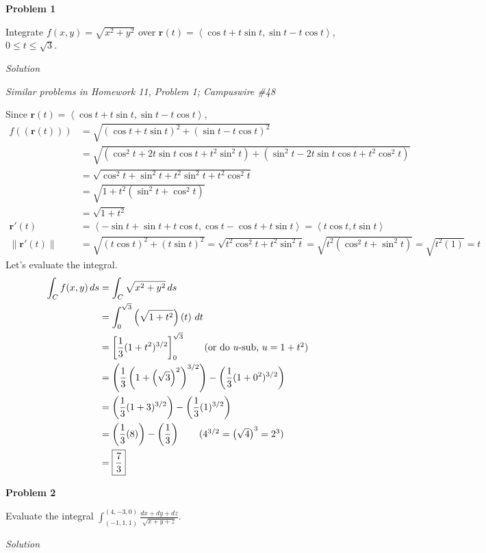 \documentclass{article}
\newcommand{\lrp}[1]{\left( #1 \right)}
\newcommand{\lra}[1]{\left\langle #1 \right\rangle}
\newcommand{\lrb}[1]{\left[ #1 \right]}
\newcommand{\norm}[1]{\left\lVert #1 \right\rVert}
\renewcommand{\r}[0]{\mathbf{r}}
\newcommand{\Solution}{\textit{Solution}}
\begin{document}
{}\textbf{Problem 1}

Integrate $f(x,y)=\sqrt{x^2+y^2}$ over $\r(t)=\lra{\cos t + t\sin t, \sin t - t\cos t}$, $0\leq t\leq \sqrt{3}$.

\Solution

\textit{Similar problems in Homework 11, Problem 1; Campuswire \#48}

Since $\r(t)=\lra{\cos t + t\sin t, \sin t - t\cos t}$,
\begin{align*}
f(\lrp{\r(t)})&=\sqrt{\lrp{\cos t + t\sin t}^2 + (\sin t - t\cos t)^2}\\
&=\sqrt{\lrp{\cos^2t + 2t\sin t \cos t + t^2\sin^2 t}+\lrp{\sin^2 t - 2t\sin t\cos t+t^2\cos^2 t}}\\
&=\sqrt{\cos^2 t +\sin^2 t + t^2\sin^2 t + t^2\cos ^ 2 t }\\
&=\sqrt{1 + t^2\lrp{\sin ^2 t + \cos ^ 2 t}}\tag{$\cos ^2 t + \sin ^2 t = 1$}\\
&=\sqrt{1 + t^2}\tag{$\sin ^2 t + \cos ^2 t + 1$}\\
    \r'(t)&=\lra{-\sin t + \sin t + t\cos t, \cos t - \cos t + t\sin t}=\lra{t\cos t, t \sin t}\\
    \norm{\r'(t)}&=\sqrt{(t\cos t)^2+(t\sin t)^2}=\sqrt{t^2\cos^2 t + t^2\sin^2 t}=\sqrt{t^2(\cos ^2 t + \sin ^2 t)}=\sqrt{t^2(1)}=t\tag{$\cos^2 t+ \sin^2 t = 1$, $t\geq 0$}
\end{align*}
Let's evaluate the integral.
\begin{align*}
   \int_C f(x,y)\,ds&= \int_C \sqrt{x^2+y^2}\,ds\\
   &=\int_0^{\sqrt{3}}\lrp{\sqrt{1+t^2}}\lrp{t}\,dt\\
   &=\lrb{\frac{1}{3}(1+t^2)^{3/2}}_0^{\sqrt{3}}\tag{or do $u$-sub, $u=1+t^2$}\\
   &=\lrp{\frac{1}{3}\lrp{1+\lrp{\sqrt{3}}^2}^{3/2}}-\lrp{\frac{1}{3}(1+0^2)^{3/2}}\\
   &=\lrp{\frac{1}{3}(1+3)^{3/2}}-\lrp{\frac{1}{3}(1)^{3/2}}\\
   &=\lrp{\frac{1}{3}(8)}-\lrp{\frac{1}{3}}\tag{$4^{3/2}=\lrp{\sqrt{4}}^3=2^3$}\\
   &=\boxed{\frac{7}{3}}
\end{align*}

{}\textbf{Problem 2}

Evaluate the integral $\displaystyle \int_{(-1,1,1)}^{(4,-3,0)}\frac{dx+dy+dz}{\sqrt{x+y+z}}$.

\Solution
\end{document}
